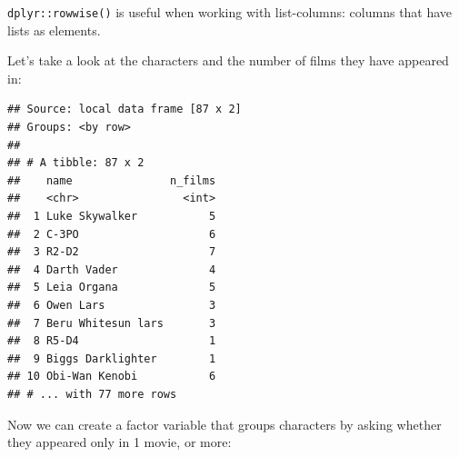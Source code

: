 \documentclass[]{gitbook}
\newenvironment{Shaded}{\begin{snugshade}}{\end{snugshade}}
\newcommand{\DataTypeTok}[1]{\textcolor[rgb]{0.13,0.29,0.53}{#1}}
\newcommand{\DecValTok}[1]{\textcolor[rgb]{0.00,0.00,0.81}{#1}}
\newcommand{\KeywordTok}[1]{\textcolor[rgb]{0.13,0.29,0.53}{\textbf{#1}}}
\newcommand{\NormalTok}[1]{#1}
\newcommand{\OperatorTok}[1]{\textcolor[rgb]{0.81,0.36,0.00}{\textbf{#1}}}
\newcommand{\StringTok}[1]{\textcolor[rgb]{0.31,0.60,0.02}{#1}}
\theoremstyle{definition}
\theoremstyle{definition}
\theoremstyle{definition}
\theoremstyle{remark}
\begin{document}
\begin{Shaded}
\end{Shaded}

\texttt{dplyr::rowwise()} is useful when working with list-columns:
columns that have lists as elements.

Let's take a look at the characters and the number of films they have
appeared in:

\begin{Shaded}
\end{Shaded}

\begin{verbatim}
## Source: local data frame [87 x 2]
## Groups: <by row>
## 
## # A tibble: 87 x 2
##    name               n_films
##    <chr>                <int>
##  1 Luke Skywalker           5
##  2 C-3PO                    6
##  3 R2-D2                    7
##  4 Darth Vader              4
##  5 Leia Organa              5
##  6 Owen Lars                3
##  7 Beru Whitesun lars       3
##  8 R5-D4                    1
##  9 Biggs Darklighter        1
## 10 Obi-Wan Kenobi           6
## # ... with 77 more rows
\end{verbatim}

Now we can create a factor variable that groups characters by asking
whether they appeared only in 1 movie, or more:

\begin{Shaded}
\end{Shaded}
\end{document}
